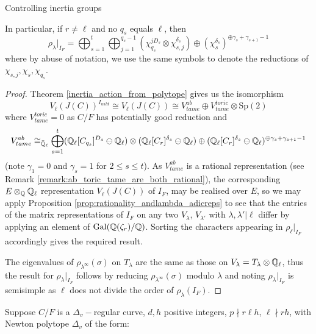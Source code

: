 \documentclass[11pt,a4paper]{article}
\newcommand{\Dv}{\Delta_v}
\newcommand{\Qr}{{\QQ(\zeta_r)}}
\begin{document}
\begin{section}{Controlling inertia groups}
\begin{corollary}
In particular, if $r \neq \ell$ and no $q_s$ equals $\ell$, then
$$\rho_\lambda|_{I_F} = \bigoplus^t_{s=1}  \bigoplus^{q_s-1}_{j=1}(\chi_{q_s}^{j D_s} \otimes \chi_{s,j}^{\delta_s})   \oplus (\chi_s^{\delta_s})^{\oplus \gamma_s + \gamma_{s+1} -1}$$
where by abuse of notation, we use the same symbols to denote the reductions of $\chi_{s,j}, \chi_s, \chi_{q_s}$.
\end{corollary}

\begin{proof}
Theorem \ref{inertia_action_from_polytope} gives us the isomorphism
\[ V_\ell(J(C))^{I_{wild}} \cong V_\ell(J(C)) \cong V^{ab}_{tame}\oplus  V^{toric}_{tame} \otimes \mathrm{Sp}(2)
\]
where $V^{toric}_{tame}=0$ as $C/F$ has potentially good reduction and
\[ V^{ab}_{tame}   \cong_{\Bar{\mathbb{Q}}_\ell} \bigoplus^t_{s=1}  (\mathbb{Q}_\ell[C_{q_s}]^{D_s} \ominus \mathbb{Q}_\ell )\otimes (\mathbb{Q}_\ell[C_{r}]^{\delta_s}  \ominus \mathbb{Q}_\ell) \oplus (\mathbb{Q}_\ell[C_{r}]^{\delta_s} \ominus \mathbb{Q}_\ell)^{\oplus \gamma_s + \gamma_{s+1} -1}
\]
(note $\gamma_1=0$ and $\gamma_s=1$ for $2\leq s \leq t$).
As $V_{tame}^{ab}$ is a rational representation (see Remark \ref{remark:ab_toric_tame_are_both_rational}), the corresponding $E \otimes _{\mathbb{Q}} \mathbb{Q}_\ell$ representation $V_\ell(J(C))$ of $I_F$, may be realised over $E$, so we may apply Proposition \ref{prop:rationality_andlambda_adicreps} to see that the entries of the matrix representations of $I_F$ on any two $V_\lambda$, $V_{\lambda'}$ with $\lambda, \lambda'|\ell$ differ by applying an element of $\Gal(\Qr/\QQ)$.
Sorting the characters appearing in $\rho_\ell|_{I_F}$ accordingly gives the required result.


The eigenvalues of $\rho_{\lambda^\infty}(\sigma)$ on $T_\lambda$ are the same as those on $V_\lambda = T_\lambda \otimes \mathbb{Q}_\ell$, thus the result for $\rho_\lambda|_{I_F}$ follows by reducing $\rho_{\lambda^\infty}(\sigma)$ modulo $\lambda$ and noting $\rho_{\lambda}|_{I_F}$ is semisimple as $\ell$ does not divide the order of $\rho_\lambda(I_F)$.
\end{proof}


\begin{proposition}
\label{prop_transvection_creation}
Suppose $C/F$ is a $\Delta_v-$regular curve, $d,h$ positive integers, $p \nmid r\ell h$, $\ell\nmid rh$, with Newton polytope $\Dv$ of the form:
\begin{center}
\end{center}
\end{proposition}
\end{section}
\end{document}

